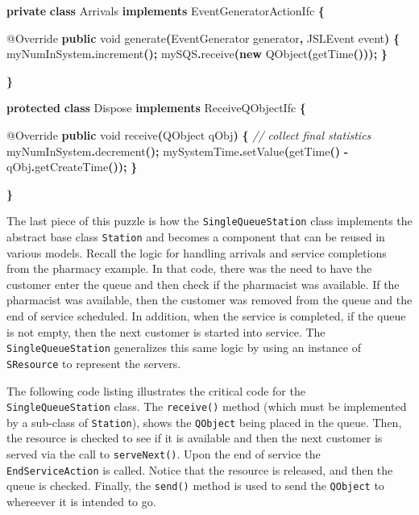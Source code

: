 \documentclass[
]{book}
\newenvironment{Shaded}{\begin{snugshade}}{\end{snugshade}}
\newcommand{\AttributeTok}[1]{\textcolor[rgb]{0.77,0.63,0.00}{#1}}
\newcommand{\CommentTok}[1]{\textcolor[rgb]{0.56,0.35,0.01}{\textit{#1}}}
\newcommand{\DataTypeTok}[1]{\textcolor[rgb]{0.13,0.29,0.53}{#1}}
\newcommand{\FunctionTok}[1]{\textcolor[rgb]{0.00,0.00,0.00}{#1}}
\newcommand{\KeywordTok}[1]{\textcolor[rgb]{0.13,0.29,0.53}{\textbf{#1}}}
\newcommand{\NormalTok}[1]{#1}
\newcommand{\OperatorTok}[1]{\textcolor[rgb]{0.81,0.36,0.00}{\textbf{#1}}}
\theoremstyle{definition}
\theoremstyle{definition}
\theoremstyle{definition}
\theoremstyle{definition}
\theoremstyle{remark}
\begin{document}
\begin{Shaded}
\begin{Highlighting}[]
    \KeywordTok{private} \KeywordTok{class}\NormalTok{ Arrivals }\KeywordTok{implements}\NormalTok{ EventGeneratorActionIfc }\OperatorTok{\{}

        \AttributeTok{@Override}
        \KeywordTok{public} \DataTypeTok{void} \FunctionTok{generate}\OperatorTok{(}\NormalTok{EventGenerator generator}\OperatorTok{,}\NormalTok{ JSLEvent event}\OperatorTok{)} \OperatorTok{\{}
\NormalTok{            myNumInSystem}\OperatorTok{.}\FunctionTok{increment}\OperatorTok{();}
\NormalTok{            mySQS}\OperatorTok{.}\FunctionTok{receive}\OperatorTok{(}\KeywordTok{new} \FunctionTok{QObject}\OperatorTok{(}\FunctionTok{getTime}\OperatorTok{()));}
        \OperatorTok{\}}

    \OperatorTok{\}}

    \KeywordTok{protected} \KeywordTok{class}\NormalTok{ Dispose }\KeywordTok{implements}\NormalTok{ ReceiveQObjectIfc }\OperatorTok{\{}

        \AttributeTok{@Override}
        \KeywordTok{public} \DataTypeTok{void} \FunctionTok{receive}\OperatorTok{(}\NormalTok{QObject qObj}\OperatorTok{)} \OperatorTok{\{}
            \CommentTok{// collect final statistics}
\NormalTok{            myNumInSystem}\OperatorTok{.}\FunctionTok{decrement}\OperatorTok{();}
\NormalTok{            mySystemTime}\OperatorTok{.}\FunctionTok{setValue}\OperatorTok{(}\FunctionTok{getTime}\OperatorTok{()} \OperatorTok{{-}}\NormalTok{ qObj}\OperatorTok{.}\FunctionTok{getCreateTime}\OperatorTok{());}
        \OperatorTok{\}}

    \OperatorTok{\}}
\end{Highlighting}
\end{Shaded}

The last piece of this puzzle is how the \texttt{SingleQueueStation} class
implements the abstract base class \texttt{Station} and becomes a component that
can be reused in various models. Recall the logic for handling arrivals
and service completions from the pharmacy example. In that code, there was the need to have
the customer enter the queue and then check if the pharmacist was
available. If the pharmacist was available, then the customer was
removed from the queue and the end of service scheduled. In addition,
when the service is completed, if the queue is not empty, then the next
customer is started into service. The \texttt{SingleQueueStation} generalizes this
same logic by using an instance of \texttt{SResource} to represent the servers.

The following code listing illustrates the critical code for the
\texttt{SingleQueueStation} class. The \texttt{receive()} method (which must be
implemented by a sub-class of \texttt{Station}), shows the \texttt{QObject} being placed
in the queue. Then, the resource is checked to
see if it is available and then the next customer is served via the call
to \texttt{serveNext()}. Upon the end of service the \texttt{EndServiceAction} is called.
Notice that the resource is released, and then the queue is
checked. Finally, the \texttt{send()} method is used to send the
\texttt{QObject} to whereever it is intended to go.
\end{document}
